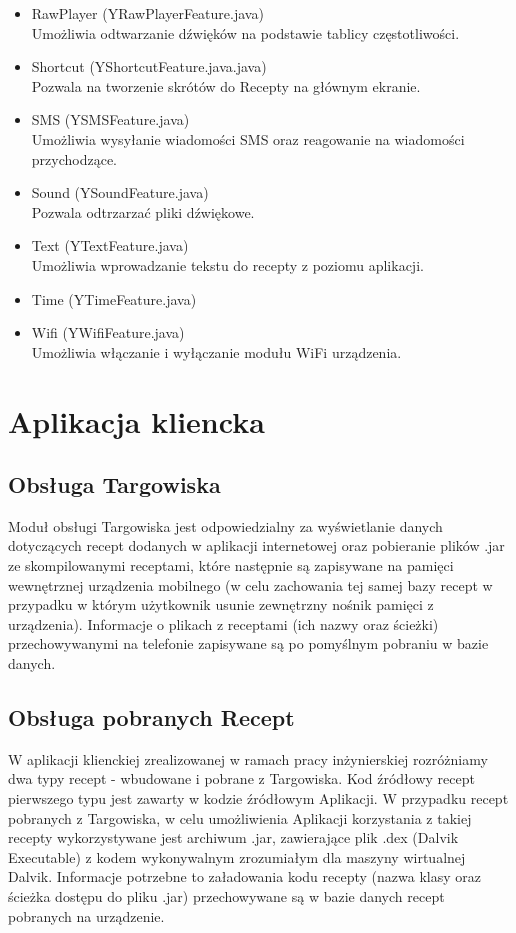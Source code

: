 \documentclass[11pt,a4paper,polish,thesis]{dcsbook}
\begin{document}
\begin{itemize}
\item{RawPlayer (YRawPlayerFeature.java)}\\
Umożliwia odtwarzanie dźwięków na podstawie tablicy częstotliwości.

\item{Shortcut (YShortcutFeature.java.java)}\\
Pozwala na tworzenie skrótów do Recepty na głównym ekranie.

\item{SMS (YSMSFeature.java)}\\
Umożliwia wysyłanie wiadomości SMS oraz reagowanie na wiadomości przychodzące.

\item{Sound (YSoundFeature.java)}\\
Pozwala odtrzarzać pliki dźwiękowe.

\item{Text (YTextFeature.java)}\\
Umożliwia wprowadzanie tekstu do recepty z poziomu aplikacji.

\item{Time (YTimeFeature.java)}\\

\item{Wifi (YWifiFeature.java)}\\
Umożliwia włączanie i wyłączanie modułu WiFi urządzenia.

\end{itemize}

\section{Aplikacja kliencka}
\subsection {Obsługa Targowiska}
Moduł obsługi Targowiska jest odpowiedzialny za  wyświetlanie danych dotyczących recept dodanych w aplikacji internetowej oraz pobieranie plików .jar ze skompilowanymi receptami, które następnie są zapisywane na pamięci wewnętrznej urządzenia mobilnego (w celu zachowania tej samej bazy recept w przypadku w którym użytkownik usunie zewnętrzny nośnik pamięci z urządzenia). Informacje o plikach z receptami (ich nazwy oraz ścieżki) przechowywanymi na telefonie zapisywane są po pomyślnym pobraniu w  bazie danych.
\subsection {Obsługa pobranych Recept}
W aplikacji klienckiej zrealizowanej w ramach pracy inżynierskiej rozróżniamy dwa typy recept - wbudowane i pobrane z Targowiska. Kod źródłowy recept pierwszego typu jest zawarty w kodzie źródłowym Aplikacji. W przypadku recept pobranych z Targowiska, w celu umożliwienia Aplikacji korzystania z takiej recepty wykorzystywane jest archiwum .jar, zawierające plik .dex (Dalvik Executable) z kodem wykonywalnym  zrozumiałym dla maszyny wirtualnej Dalvik. Informacje potrzebne to załadowania kodu recepty (nazwa klasy oraz ścieżka dostępu do pliku .jar) przechowywane są w bazie danych recept pobranych na urządzenie. 
\end{document}

